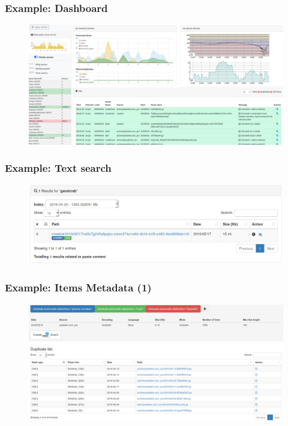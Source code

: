 \documentclass{beamer}
\begin{document}
\begin{frame}
    \frametitle{Example: Dashboard}
    \begin{figure}
        \includegraphics[scale=0.18, angle=0]{screenshot/dashboard.png}
    \end{figure}
\end{frame}


\begin{frame}
    \frametitle{Example: Text search}
    \begin{figure}
        \includegraphics[scale=0.3, angle=0]{images/ail_02.png}
    \end{figure}
\end{frame}

\begin{frame}
    \frametitle{Example: Items Metadata (1)}
    \begin{figure}
        \includegraphics[scale=0.21, angle=0]{images/ail_15.png}
    \end{figure}
\end{frame}
\end{document}
